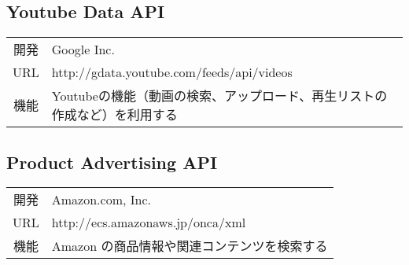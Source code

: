 \subsection{Youtube Data API}
\begin{tabular}{c|l}
開発 & Google Inc. \\
URL & http://gdata.youtube.com/feeds/api/videos \\
機能 & Youtubeの機能（動画の検索、アップロード、再生リストの作成など）を利用する
\end{tabular}
\subsection{Product Advertising API}
\begin{tabular}{c|l}
開発 & Amazon.com, Inc.\\
URL & http://ecs.amazonaws.jp/onca/xml \\
機能 & Amazon の商品情報や関連コンテンツを検索する
\end{tabular}
